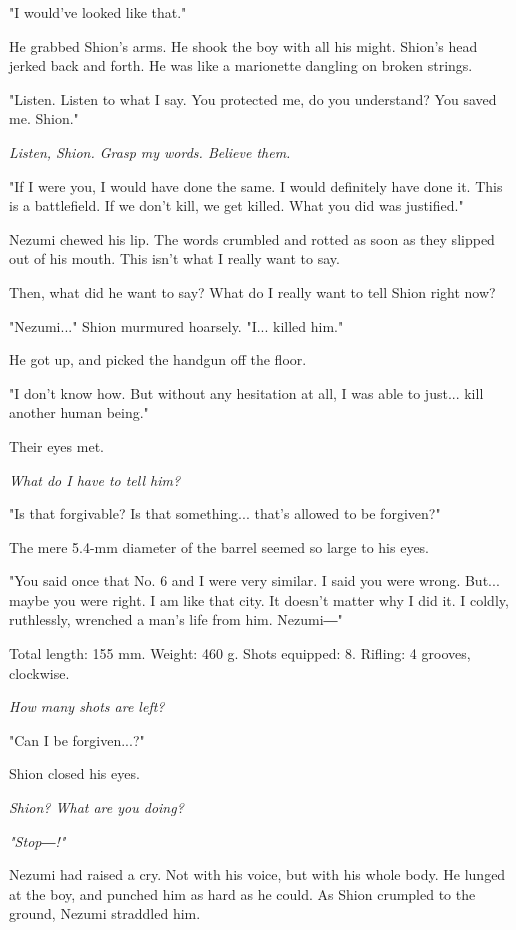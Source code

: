 "I would've looked like that."

He grabbed Shion's arms. He shook the boy with all his might. Shion's
head jerked back and forth. He was like a marionette dangling on broken
strings.

"Listen. Listen to what I say. You protected me, do you understand? You
saved me. Shion."

\emph{Listen, Shion. Grasp my words. Believe them.}

"If I were you, I would have done the same. I would definitely have done
it. This is a battlefield. If we don't kill, we get killed. What you did
was justified."

Nezumi chewed his lip. The words crumbled and rotted as soon as they
slipped out of his mouth. This isn't what I really want to say.

Then, what did he want to say? What do I really want to tell Shion right
now?

"Nezumi..." Shion murmured hoarsely. "I... killed him."

He got up, and picked the handgun off the floor.

"I don't know how. But without any hesitation at all, I was able to
just... kill another human being."

Their eyes met.

\emph{What do I have to tell him?}

"Is that forgivable? Is that something... that's allowed to be
forgiven?"

The mere 5.4-mm diameter of the barrel seemed so large to his eyes.

"You said once that No. 6 and I were very similar. I said you were
wrong. But... maybe you were right. I am like that city. It doesn't
matter why I did it. I coldly, ruthlessly, wrenched a man's life from
him. Nezumi―"

Total length: 155 mm. Weight: 460 g. Shots equipped: 8. Rifling: 4
grooves, clockwise.

\emph{How many shots are left?}

"Can I be forgiven...?"

Shion closed his eyes.

\emph{Shion? What are you doing?}

\emph{"Stop―!"}

Nezumi had raised a cry. Not with his voice, but with his whole body. He
lunged at the boy, and punched him as hard as he could. As Shion
crumpled to the ground, Nezumi straddled him.

